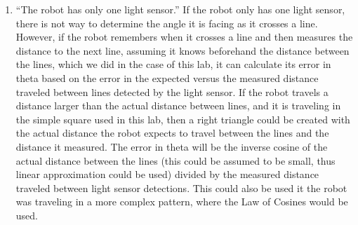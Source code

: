 \documentclass[twocolumn]{article}
\begin{document}
\begin{enumerate}
\begin{enumerate}
\item ``The robot has only one light sensor.\cite{lab2}''
If the robot only has one light sensor, there is not way to determine the angle it is facing as it crosses a line. However, if the robot remembers when it crosses a line and then measures the distance to the next line, assuming it knows beforehand the distance between the lines, which we did in the case of this lab, it can calculate its error in theta based on the error in the expected versus the measured distance traveled between lines detected by the light sensor.
If the robot travels a distance larger than the actual distance between lines, and it is traveling in the simple square used in this lab, then a right triangle could be created with the actual distance the robot expects to travel between the lines and the distance it measured.
The error in theta will be the inverse cosine of the actual distance between the lines (this could be assumed to be small, thus linear approximation could be used) divided by the measured distance traveled between light sensor detections.
This could also be used it the robot was traveling in a more complex pattern, where the Law of Cosines would be used.

\end{enumerate}

\end{enumerate}


\end{document}
